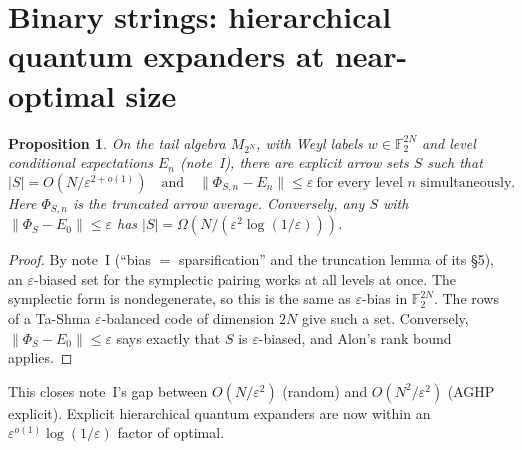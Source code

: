 \documentclass[11pt]{article}
\newtheorem{proposition}[theorem]{Proposition}
\theoremstyle{definition}
\theoremstyle{remark}
\newcommand{\F}{\mathbb F}
\begin{document}
\section{Binary strings: hierarchical quantum expanders at near-optimal size}

\begin{proposition}\label{prop:tashma}
On the tail algebra $M_{2^N}$, with Weyl labels $w\in\F_2^{2N}$ and level conditional expectations $E_n$ (note~I), there are explicit arrow sets $S$ such that
\[|S|=O(N/\varepsilon^{2+o(1)})\quad\text{and}\quad\|\Phi_{S,n}-E_n\|\le\varepsilon\ \text{for every level }n\text{ simultaneously.}\]
Here $\Phi_{S,n}$ is the truncated arrow average. Conversely, any $S$ with $\|\Phi_S-E_0\|\le\varepsilon$ has $|S|=\Omega(N/(\varepsilon^2\log(1/\varepsilon)))$.
\end{proposition}

\begin{proof}
By note~I (``bias $=$ sparsification'' and the truncation lemma of its \S5), an $\varepsilon$-biased set for the symplectic pairing works at all levels at once. The symplectic form is nondegenerate, so this is the same as $\varepsilon$-bias in $\F_2^{2N}$. The rows of a Ta-Shma $\varepsilon$-balanced code of dimension $2N$ give such a set. Conversely, $\|\Phi_S-E_0\|\le\varepsilon$ says exactly that $S$ is $\varepsilon$-biased, and Alon's rank bound applies.
\end{proof}

This closes note~I's gap between $O(N/\varepsilon^2)$ (random) and $O(N^2/\varepsilon^2)$ (AGHP explicit). Explicit hierarchical quantum expanders are now within an $\varepsilon^{o(1)}\log(1/\varepsilon)$ factor of optimal.
\end{document}
